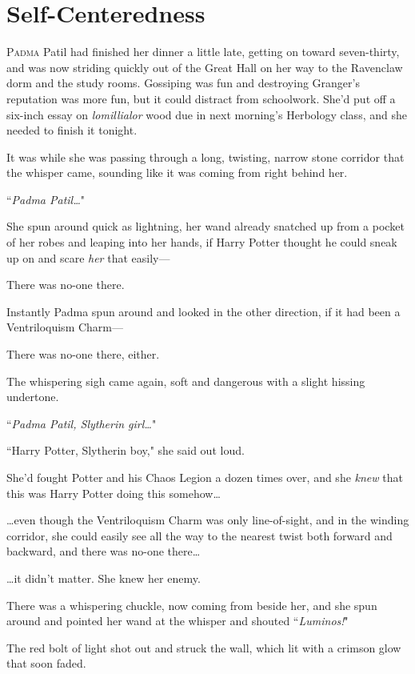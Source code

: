 \chapter{Self-Centeredness}

\lettrine{P}{adma} Patil had finished her dinner a little late, getting on toward seven-thirty, and was now striding quickly out of the Great Hall on her way to the Ravenclaw dorm and the study rooms. Gossiping was fun and destroying Granger's reputation was more fun, but it could distract from schoolwork. She'd put off a six-inch essay on \emph{lomillialor} wood due in next morning's Herbology class, and she needed to finish it tonight.

It was while she was passing through a long, twisting, narrow stone corridor that the whisper came, sounding like it was coming from right behind her.

``\emph{Padma Patil{\ldots}}"

She spun around quick as lightning, her wand already snatched up from a pocket of her robes and leaping into her hands, if Harry Potter thought he could sneak up on and scare \emph{her} that easily—

There was no-one there.

Instantly Padma spun around and looked in the other direction, if it had been a Ventriloquism Charm—

There was no-one there, either.

The whispering sigh came again, soft and dangerous with a slight hissing undertone.

``\emph{Padma Patil, Slytherin girl{\ldots}}"

``Harry Potter, Slytherin boy," she said out loud.

She'd fought Potter and his Chaos Legion a dozen times over, and she \emph{knew} that this was Harry Potter doing this somehow{\ldots}

{\ldots}even though the Ventriloquism Charm was only line-of-sight, and in the winding corridor, she could easily see all the way to the nearest twist both forward and backward, and there was no-one there{\ldots}

{\ldots}it didn't matter. She knew her enemy.

There was a whispering chuckle, now coming from beside her, and she spun around and pointed her wand at the whisper and shouted ``\emph{Luminos!}"

The red bolt of light shot out and struck the wall, which lit with a crimson glow that soon faded.

